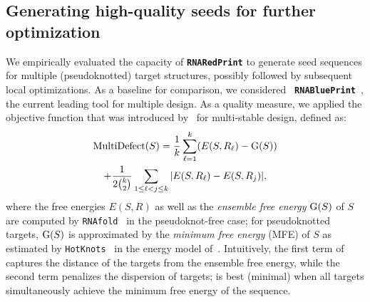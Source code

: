 \documentclass{bmcart}
\newcommand{\Def}[1]{\emph{#1}}
\newcommand{\EnsE}{\text{\rm G}} %
\newcommand{\Obj}{\text{\rm MultiDefect}}
\newcommand{\RNAblueprint}{{\tt \bfseries{}\color{black!85} RNA\textcolor{blue!70!black}{Blue}Print}}
\newcommand{\ourprog}{{\tt \bfseries{}\color{black!85}RNA\textcolor{red!70!black}{Red}Print}}
\newcommand{\citep}[1]{\cite{#1}}
\newcommand{\citet}[1]{\cite{#1}}
\begin{document}
\subsection*{Generating high-quality seeds for further optimization}
We empirically evaluated the capacity of \ourprog{} to generate seed sequences for multiple (pseudoknotted) target structures, possibly followed by subsequent local optimizations. As a baseline for comparison, we considered \RNAblueprint~\citep{Hammer2017}, the current leading tool for multiple design.
As a quality measure, we applied the objective function that was introduced by~\citet{Hammer2017} for multi-stable design, defined as:
\begin{multline}
  \label{eq:blueprintobjective}
    \Obj(S) = \frac{1}{k} \sum_{\ell=1}^{k} (E(S, R_\ell) - \EnsE(S))\\
    +\frac{1}{2\binom{k}{2}} \sum\limits_{1\leq\ell<j\leq k}|E(S,R_\ell) - E(S,R_j)|,
\end{multline}
%
where the free energies $E(S, R)$ as well as the \Def{ensemble free energy} $\EnsE(S)$ of $S$ are computed
by {\tt RNAfold}~\citep{Lorenz2011} in the pseudoknot-free case; for
pseudoknotted targets, $\EnsE(S)$ is approximated by the \Def{minimum
  free energy} (MFE) of $S$ as estimated by {\tt HotKnots}~\citep{Ren2005} in the energy model
of~\citet{dirks-pierce-03}.  Intuitively, the first term of \Obj{}
captures the distance of the targets from the ensemble free energy,
while the second term penalizes the dispersion of targets; \Obj{} is
best (minimal) when all targets simultaneously achieve the minimum
free energy of the sequence.
\end{document}
